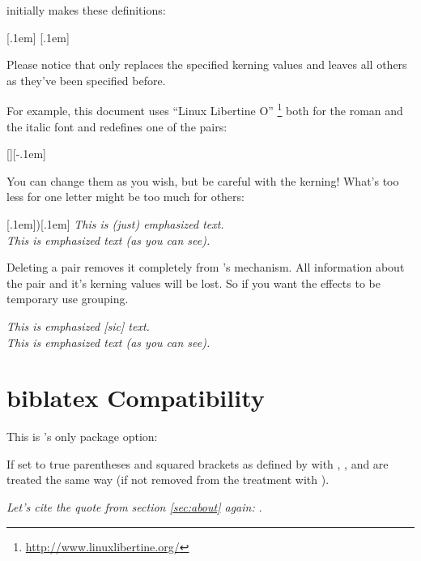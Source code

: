 \documentclass[DIV10,toc=index,toc=bib]{cnpkgdoc}
\begin{document}
\embrac initially makes these definitions:
\begin{beispiel}
 \AddEmph{(}{)}[.1em]
 \AddEmph{[}{]}[.1em]
\end{beispiel}
Please notice that  only replaces the specified kerning values
and leaves all others as they've been specified before.

For example, this document uses ``Linux Libertine O''%
\footnote{\url{http://www.linuxlibertine.org/}} both for the roman and the italic
font and redefines one of the pairs:
\begin{beispiel}
 \RenewEmph{[}{]}[][-.1em] %
\end{beispiel}

You can change them as you wish, but be careful with the kerning! What's too less
for one letter might be too much for others:
\begin{beispiel}
 \RenewEmph{(}[.1em]{)}[.1em]
 \emph{This is (just) emphasized text.} \\ %
 \emph{This is emphasized text (as you can see).} %
\end{beispiel}

Deleting a pair removes it completely from \embrac's mechanism. All information
about the pair and it's kerning values will be lost. So if you want the effects
to be temporary use grouping.
\begin{beispiel}
 \DeleteEmph[]
 \emph{This is emphasized [sic] text.} \\
 \emph{This is emphasized text (as you can see).}
\end{beispiel}

\section{biblatex Compatibility}
This is \embrac's only package option:
\begin{beschreibung}
  If set to true parentheses
 and squared brackets as defined by  with ,
 ,  and  are treated
 the same way (if not removed from the treatment with ).
\end{beschreibung}

\begin{beispiel}
 \emph{Let's cite the quote from section \ref{sec:about} again: \cite{bringhurst04}}.
\end{beispiel}
\end{document}
